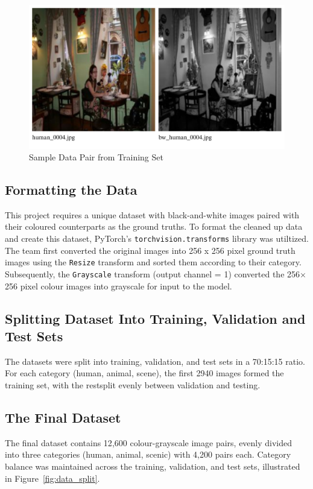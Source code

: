 \documentclass{article} %
\begin{document}
\begin{figure}[htbp]            %
  \centering
  \includegraphics[width=0.65\linewidth]{Figs/Data Example.png}
  \caption{Sample Data Pair from Training Set}
  \label{fig:data_example}
\end{figure}

\subsection{Formatting the Data}

This project requires a unique dataset with black-and-white images paired with their coloured counterparts as the ground truths. To format the cleaned up data and create this dataset, 
PyTorch's \verb|torchvision.transforms| library was utiltized. The team first converted the original images into 256 x 256 pixel ground truth images using the \verb|Resize| transform 
and sorted them according to their category. Subsequently, the \verb|Grayscale| transform (output channel = 1) converted the 256$\times$256 pixel colour images into grayscale for input 
to the model.

\subsection{Splitting Dataset Into Training, Validation and Test Sets}

The datasets were split into training, validation, and test sets in a 70:15:15 ratio. For each category (human, animal, scene), the first 2940 images formed the training set, with the 
restsplit evenly between validation and testing.

\subsection{The Final Dataset}

The final dataset contains 12{,}600 colour-grayscale image pairs, evenly divided into three categories (human, animal, scenic) with 4{,}200 pairs each. Category balance was maintained 
across the training, validation, and test sets, illustrated in Figure~\ref{fig:data_split}. 
\end{document}
